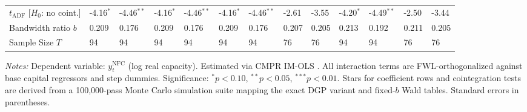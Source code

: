 \begin{table}[h!]
\begin{tabular}{p{3.2cm}p{1.0cm}p{1.0cm}p{1.0cm}p{1.0cm}p{1.0cm}p{1.0cm}p{1.0cm}p{1.0cm}p{1.0cm}p{1.0cm}p{1.0cm}p{1.0cm}}
		$t_{\text{ADF}}$ [$H_0$: no coint.] & -4.16$^{*}$ & -4.46$^{**}$ & -4.16$^{*}$ & -4.46$^{**}$ & -4.16$^{*}$ & -4.46$^{**}$ & -2.61 & -3.55 & -4.20$^{*}$ & -4.49$^{**}$ & -2.50 & -3.44 \\
		Bandwidth ratio $b$ & 0.209 & 0.176 & 0.209 & 0.176 & 0.209 & 0.176 & 0.207 & 0.205 & 0.213 & 0.192 & 0.211 & 0.205 \\
		Sample Size $T$ & 94 & 94 & 94 & 94 & 94 & 94 & 76 & 76 & 94 & 94 & 76 & 76 \\
		\bottomrule
	\end{tabular}
	\begin{minipage}{\textwidth}
		\scriptsize
		\textit{Notes:} Dependent variable: $y_t^{\text{NFC}}$ (log real capacity). Estimated via CMPR IM-OLS \citep{VogelsangWagner2024}. All interaction terms are FWL-orthogonalized against base capital regressors and step dummies. Significance: $^*p<0.10$, $^{**}p<0.05$, $^{***}p<0.01$. Stars for coefficient rows and cointegration tests are derived from a 100,000-pass Monte Carlo simulation suite mapping the exact DGP variant and fixed-$b$ Wald tables. Standard errors in parentheses.
	\end{minipage}
\end{table}


